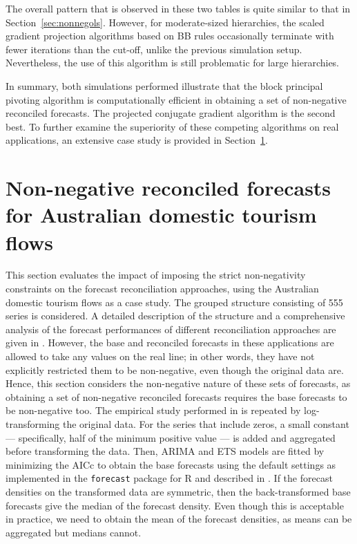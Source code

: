 \documentclass[11pt]{article}
\newcommand{\0}{\phantom{0}}
\begin{document}
The overall pattern that is observed in these two tables is quite similar to that in Section~\ref{sec:nonnegols}. However, for moderate-sized hierarchies, the scaled gradient projection algorithms based on BB rules occasionally terminate with fewer iterations than the cut-off, unlike the previous simulation setup. Nevertheless, the use of this algorithm is still problematic for  large hierarchies.

In summary, both simulations performed illustrate that the block principal pivoting algorithm is computationally efficient in obtaining a set of non-negative reconciled forecasts. The projected conjugate gradient algorithm is the second best. To further examine the superiority of these competing algorithms on real applications, an extensive case study is provided in Section~\ref{sec:AUSNN}.

\section{Non-negative reconciled forecasts for Australian domestic tourism flows}
\label{sec:AUSNN}
This section evaluates the impact of imposing the strict non-negativity constraints on the forecast reconciliation approaches, using the Australian domestic tourism flows as a case study. The grouped structure consisting of 555 series is considered. A detailed description of the structure and a comprehensive analysis of the forecast performances of different reconciliation approaches are given in \citet{Wick2018}. However, the base and reconciled forecasts in these applications are allowed to take any values on the real line; in other words, they have not explicitly restricted them to be non-negative, even though the original data are. Hence, this section considers the non-negative nature of these sets of forecasts, as obtaining a set of non-negative reconciled forecasts requires the base forecasts to be non-negative too. The empirical study performed in \citet{Wick2018} is repeated by log-transforming the original data. For the series that include zeros, a small constant --- specifically, half of the minimum positive value --- is added and aggregated before transforming the data. Then, ARIMA and ETS models are fitted by minimizing the AICc to obtain the base forecasts using the default settings as implemented in the \texttt{forecast} package for R \citet{forecast2016} and described in \citet{Hyndman2008}. If the forecast densities on the transformed data are symmetric, then the back-transformed base forecasts give the median of the forecast density. Even though this is acceptable in practice, we need to obtain the mean of the forecast densities, as means can be aggregated but medians cannot.
\end{document}
